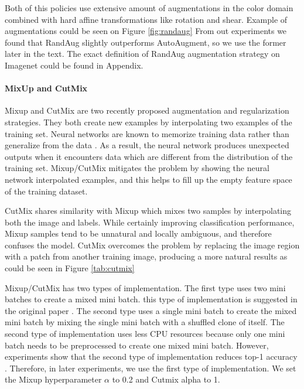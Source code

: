 Both of this policies use extensive amount of augmentations in the color domain combined with hard affine transformations like rotation and shear. Example of augmentations could be seen on Figure \ref{fig:randaug}
From out experiments we found that RandAug slightly outperforms AutoAugment, so we use the former later in the text. The exact definition of RandAug augmentation strategy on Imagenet could be found in Appendix. 


\paragraph{MixUp and CutMix}


Mixup \cite{zhang2017_mixup} and CutMix \cite{yun2019_cutmix} are two recently proposed augmentation and regularization strategies. They both create new examples by interpolating two examples of the training set. Neural networks are known to memorize training data rather than generalize from the data \cite{zhang2016_understanding_deep}. As a result, the neural network produces unexpected outputs when it encounters data which are different from the distribution of the training set. Mixup/CutMix mitigates the problem by showing the neural network interpolated examples, and this helps to fill up the empty feature space of the training dataset.



CutMix shares similarity with Mixup which mixes two samples by interpolating both the image and labels. While certainly improving classification performance, Mixup samples tend to be unnatural and locally ambiguous, and therefore confuses the model. CutMix overcomes the problem by replacing the image region with a patch from another training image, producing a more natural results as could be seen in Figure \ref{tab:cutmix}

Mixup/CutMix has two types of implementation. The first type uses two mini batches to create a mixed mini batch. this type of implementation is suggested in the original paper \cite{zhang2017_mixup}. The second type uses a single mini batch to create the mixed mini batch by mixing the single mini batch with a shuffled clone of itself. The second type of implementation uses less CPU resources because only one mini batch needs to be preprocessed to create one mixed mini batch. However, experiments show that the second type of implementation reduces top-1 accuracy \cite{lee2020_compounding_improvements}. Therefore, in later experiments, we use the first type of implementation. We set the Mixup hyperparameter $\alpha$ to 0.2 and Cutmix alpha to 1. 


